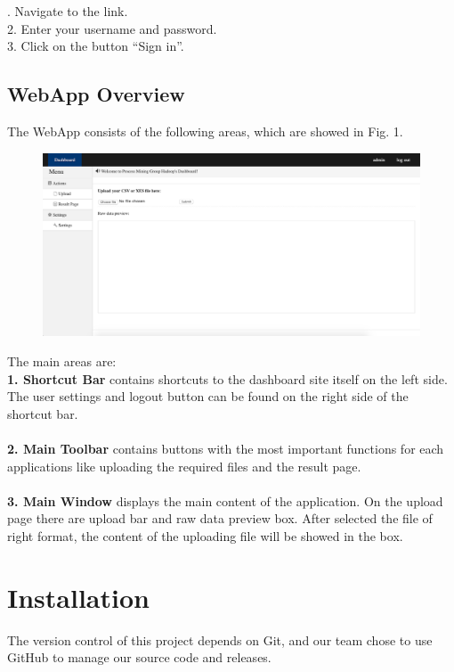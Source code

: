 \documentclass[runningheads]{llncs}
\begin{document}
. Navigate to the link.\\
2. Enter your username and password.\\
3. Click on the button “Sign in”.\\

\subsection{WebApp Overview}
The WebApp consists of the following areas, which are showed in Fig. 1.\\

\begin{figure}[h]	
	\centering
	\includegraphics[scale=0.24]{dashboard.png}
	\caption{}
	\label{fig:label}
\end{figure}
\noindent
The main areas are:\\

\noindent
\textbf{1. Shortcut Bar} contains shortcuts to the dashboard site itself on the left side. The user settings and logout button can be found on the right side of the shortcut bar.\\\\
\noindent
\textbf{2. Main Toolbar} contains buttons with the most important functions for each applications like uploading the required files and the result page.\\\\
\noindent
\textbf{3. Main Window} displays the main content of the application. On the upload page there are upload bar and raw data preview box. After selected the file of right format, the content of the uploading file will be showed in the box.

\section{Installation}
The version control of this project depends on Git, and our team chose to use GitHub to manage our source code and releases.\\\\
\end{document}
